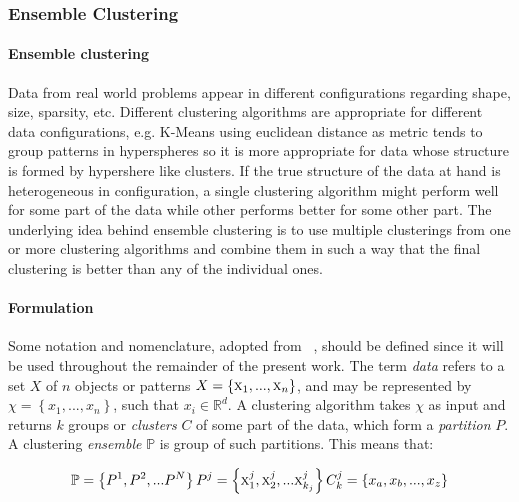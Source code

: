 \subsubsection{Ensemble Clustering}
\label{sec:eac}

\paragraph{Ensemble clustering}
Data from real world problems appear in different configurations regarding shape, size, sparsity, etc. %
Different clustering algorithms are appropriate for different data configurations, e.g. K-Means using euclidean distance as metric tends to group patterns in hyperspheres so it is more appropriate for data whose structure is formed by hypershere like clusters.%
If the true structure of the data at hand is heterogeneous in configuration, a single clustering algorithm might perform well for some part of the data while other performs better for some other part. The underlying idea behind ensemble clustering is to use multiple clusterings from one or more clustering algorithms and combine them in such a way that the final clustering is better than any of the individual ones.

\paragraph{Formulation}
Some notation and nomenclature, adopted from ~\cite{Fred2005}, should be defined since it will be used throughout the remainder of the present work. The term \emph{data} refers to a set $X$ of $n$ objects or patterns $X=\left \{ \textsc{x}_1,...,\textsc{x}_n \right \}$, and may be represented by $\chi = \left \{ x_1,...,x_n \right \}$, such that $x_i \in  \mathbb{R}^d$. A clustering algorithm takes $\chi$ as input and returns $k$ groups or \emph{clusters} $C$ of some part of the data, which form a \emph{partition} $P$. A clustering \emph{ensemble} $\mathbb{P}$ is group of such partitions. This means that:

$$
\mathbb{P} = \left \{   P^1, P^2, ... P^N   \right \} \\
P^j = \left \{   \textsc{x}^j_1, \textsc{x}^j_2, ... \textsc{x}^{j}_{k_j}   \right \} \\
C^j_k = \left \{   x_a, x_b, ..., x_z   \right \}
$$

